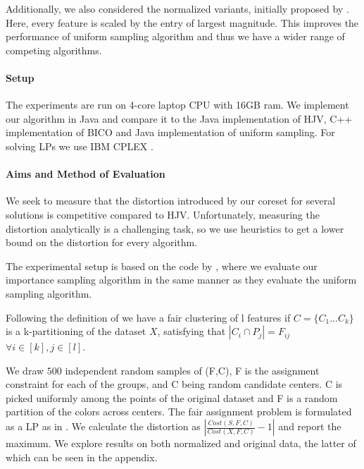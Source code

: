 Additionally, we also considered the normalized variants, initially proposed by \cite{HuangJV19}. Here, every feature is scaled by the entry of largest magnitude. This improves the performance of uniform sampling algorithm and thus we have a wider range of competing algorithms.

\paragraph{Setup}
The experiments are run on 4-core laptop CPU with 16GB ram. We implement our algorithm in Java and compare it to the Java implementation of HJV\cite{HuangJV19}, C++ implementation of BICO and Java implementation of uniform sampling. For solving LPs we use IBM CPLEX \cite{CPLEX}.


\paragraph{Aims and Method of Evaluation}
We seek to measure that the distortion introduced by our coreset for several solutions is competitive compared to HJV. Unfortunately, measuring the distortion analytically is a challenging task, so we use heuristics to get a lower bound on the distortion for every algorithm.

The experimental setup is based on the code by \cite{HuangJV19}, where we evaluate our importance sampling algorithm in the same manner as they evaluate the uniform sampling algorithm.

Following the definition of \cite{HuangJV19} we have a fair clustering of l features if $C=\{C_1...C_k\}$ is a k-partitioning of the dataset $X$, satisfying that $|C_i\cap P_j|=F_{ij}$ $\forall i\in [k], j\in [l]$. 

We draw $500$ independent random samples of (F,C), F is the assignment constraint for each of the groups, and C being random candidate centers. C is picked uniformly among the points of the original dataset and F is a random partition of the colors across centers. The fair assignment problem is formulated as a LP as in \cite{HuangJV19}. We calculate the distortion as   $|\frac{Cost(S,F,C)}{Cost(X,F,C)}-1|$ and report the maximum. We explore results on both normalized and original data, the latter of which can be seen in the appendix. 

